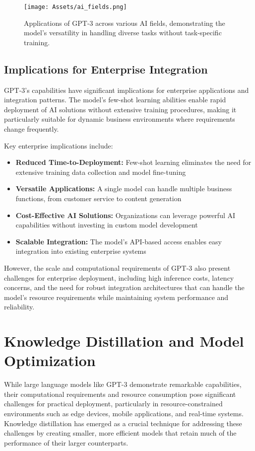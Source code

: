 \begin{figure}[H]
    \centering
    \texttt{[image: Assets/ai\_fields.png]}
    \caption{Applications of GPT-3 across various AI fields, demonstrating the model's versatility in handling diverse tasks without task-specific training.}
    \label{fig:ai_fields}
\end{figure}

\subsection{Implications for Enterprise Integration}

GPT-3's capabilities have significant implications for enterprise applications and integration patterns. The model's few-shot learning abilities enable rapid deployment of AI solutions without extensive training procedures, making it particularly suitable for dynamic business environments where requirements change frequently.

Key enterprise implications include:
\begin{itemize}
    \item \textbf{Reduced Time-to-Deployment:} Few-shot learning eliminates the need for extensive training data collection and model fine-tuning
    \item \textbf{Versatile Applications:} A single model can handle multiple business functions, from customer service to content generation
    \item \textbf{Cost-Effective AI Solutions:} Organizations can leverage powerful AI capabilities without investing in custom model development
    \item \textbf{Scalable Integration:} The model's API-based access enables easy integration into existing enterprise systems
\end{itemize}

However, the scale and computational requirements of GPT-3 also present challenges for enterprise deployment, including high inference costs, latency concerns, and the need for robust integration architectures that can handle the model's resource requirements while maintaining system performance and reliability.

\section{Knowledge Distillation and Model Optimization}

While large language models like GPT-3 demonstrate remarkable capabilities, their computational requirements and resource consumption pose significant challenges for practical deployment, particularly in resource-constrained environments such as edge devices, mobile applications, and real-time systems. Knowledge distillation has emerged as a crucial technique for addressing these challenges by creating smaller, more efficient models that retain much of the performance of their larger counterparts.

